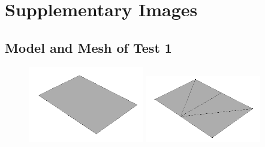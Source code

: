 \documentclass[a4paper, 12pt]{article}
\begin{document}
\section{Supplementary Images} \label{sec:img}
\subsection{Model and Mesh of Test 1} \label{subsec:test1Img}
\begin{figure}[H]
  \centering
  \subfigure
    { \includegraphics[width=0.45\textwidth, height=0.45\textwidth]{test1_smd}}
  \subfigure
    { \includegraphics[width=0.45\textwidth, height=0.45\textwidth]{test1_sms}}
\end{figure}
\end{document}
